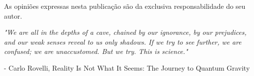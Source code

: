 \documentclass[12pt,a4paper,twoside,openright]{book}
\makeatletter
\def\blankpage{%
      \clearpage%
      \thispagestyle{empty}%
      \null%
      \clearpage}
\def\cleardoublepage{\clearpage\if@twoside \ifodd\c@page\else
    \hbox{}
    \thispagestyle{plain}
    \newpage
    \if@twocolumn\hbox{}\newpage\fi\fi\fi}
\makeatother
\begin{document}
\begin{sloppy}
\frontmatter


\clearpage \thispagestyle{empty}\mbox{}\clearpage


\clearpage \thispagestyle{empty}\mbox{}\clearpage

\newpage
\thispagestyle{empty}
\vspace*{\fill}
\begin{center}
    \vspace*{\fill}
    As opiniões expressas nesta publicação são da exclusiva responsabilidade do seu autor. \\
    
    \vspace*{2cm}
    
    \begingroup
        \fontsize{14pt}{12pt}\selectfont
    \endgroup
\end{center}
\blankpage

\newpage
\thispagestyle{empty}
\vspace*{3cm}
\begin{center}
\emph{"We are all in the depths of a cave, chained by our ignorance, by our prejudices, and our weak senses reveal to us only shadows. If we try to see further, we are confused; we are unaccustomed. But we try. This is science."} \\
\end{center} 
\begin{flushright}- Carlo Rovelli, Reality Is Not What It Seems: The Journey to Quantum Gravity\end{flushright}
\clearpage \thispagestyle{empty}\mbox{}\clearpage
\cleardoublepage


\end{sloppy}
\end{document}
